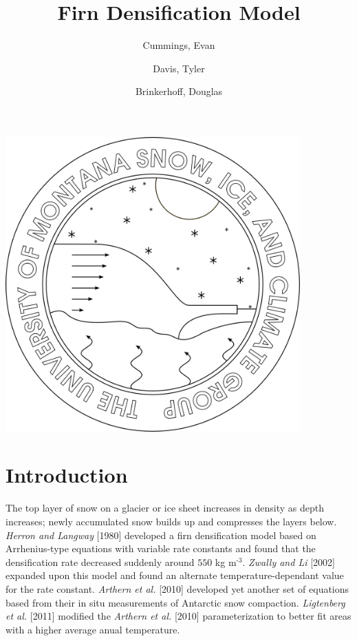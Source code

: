 \documentclass{article}%
\newcommand{\sups}[1]{\ensuremath{^{\textrm{#1}}}}
\begin{document}

\title{Firn Densification Model}
\author{Cummings, Evan \and Davis, Tyler \and Brinkerhoff, Douglas}
\maketitle
\begin{center}
\includegraphics[width=4.455666122085252in]{images/logoPlain.png}
\end{center}

\twocolumn


\section{Introduction}

The top layer of snow on a glacier or ice sheet increases in density as depth increases; newly accumulated snow builds up and compresses the layers below.  \emph{Herron and Langway} [1980] developed a firn densification model based on Arrhenius-type equations with variable rate constants and found that the densification rate decreased suddenly around $550$ kg m\sups{-3}.  \emph{Zwally and Li} [2002] expanded upon this model and found an alternate temperature-dependant value for the rate constant.  \emph{Arthern et al.} [2010] developed yet another set of equations based from their in situ measurements of Antarctic snow compaction.  \emph{Ligtenberg et al.} [2011] modified the \emph{Arthern et al.} [2010] parameterization to better fit areas with a higher average anual temperature. 
\end{document}
